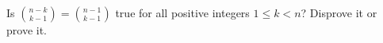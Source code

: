 Is $\binom{n-k}{k-1}=\binom{n-1}{k-1}$ true for all positive integers $1\le k<n$? Disprove it or prove it.
